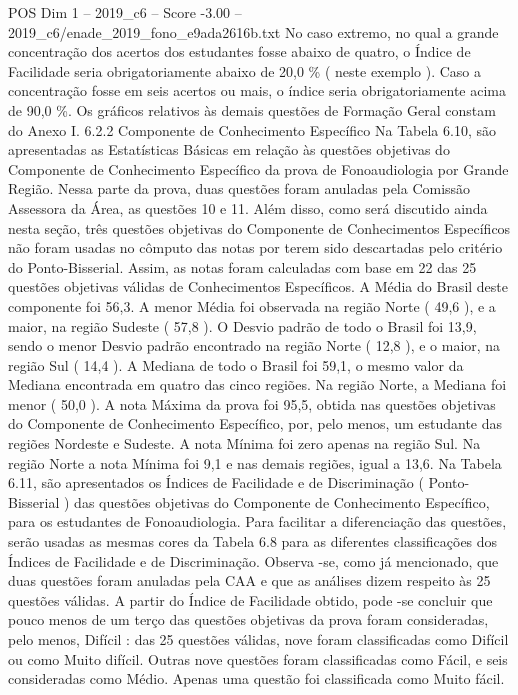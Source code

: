 \begin{textsample}{POS Dim 1 – 2019\_c6 – Score -3.00 – 2019\_c6/enade\_2019\_fono\_e9ada2616b.txt}
No caso extremo, no qual a grande concentração dos acertos dos estudantes fosse abaixo de quatro, o Índice de Facilidade seria obrigatoriamente abaixo de 20,0 \% ( neste exemplo ).
Caso a concentração fosse em seis acertos ou mais, o índice seria obrigatoriamente acima de 90,0 \%.
Os gráficos relativos às demais questões de Formação Geral constam do Anexo I. 6.2.2 Componente de Conhecimento Específico Na Tabela 6.10, são apresentadas as Estatísticas Básicas em relação às questões objetivas do Componente de Conhecimento Específico da prova de Fonoaudiologia por Grande Região.
Nessa parte da prova, duas questões foram anuladas pela Comissão Assessora da Área, as questões 10 e 11.
Além disso, como será discutido ainda nesta seção, três questões objetivas do Componente de Conhecimentos Específicos não foram usadas no cômputo das notas por terem sido descartadas pelo critério do Ponto-Bisserial.
Assim, as notas foram calculadas com base em 22 das 25 questões objetivas válidas de Conhecimentos Específicos.
A Média do Brasil deste componente foi 56,3.
A menor Média foi observada na região Norte ( 49,6 ), e a maior, na região Sudeste ( 57,8 ).
O Desvio padrão de todo o Brasil foi 13,9, sendo o menor Desvio padrão encontrado na região Norte ( 12,8 ), e o maior, na região Sul ( 14,4 ).
A Mediana de todo o Brasil foi 59,1, o mesmo valor da Mediana encontrada em quatro das cinco regiões.
Na região Norte, a Mediana foi menor ( 50,0 ).
A nota Máxima da prova foi 95,5, obtida nas questões objetivas do Componente de Conhecimento Específico, por, pelo menos, um estudante das regiões Nordeste e Sudeste.
A nota Mínima foi zero apenas na região Sul.
Na região Norte a nota Mínima foi 9,1 e nas demais regiões, igual a 13,6.
Na Tabela 6.11, são apresentados os Índices de Facilidade e de Discriminação ( Ponto-Bisserial ) das questões objetivas do Componente de Conhecimento Específico, para os estudantes de Fonoaudiologia.
Para facilitar a diferenciação das questões, serão usadas as mesmas cores da Tabela 6.8 para as diferentes classificações dos Índices de Facilidade e de Discriminação.
Observa -se, como já mencionado, que duas questões foram anuladas pela CAA e que as análises dizem respeito às 25 questões válidas.
A partir do Índice de Facilidade obtido, pode -se concluir que pouco menos de um terço das questões objetivas da prova foram consideradas, pelo menos, Difícil : das 25 questões válidas, nove foram classificadas como Difícil ou como Muito difícil.
Outras nove questões foram classificadas como Fácil, e seis consideradas como Médio.
Apenas uma questão foi classificada como Muito fácil.

\end{textsample}
